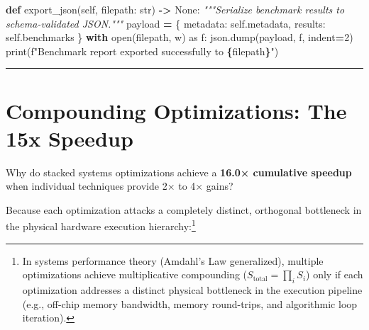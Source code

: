 \documentclass[
  letterpaper,
]{scrbook}
\newenvironment{Shaded}{\begin{snugshade}}{\end{snugshade}}
\newcommand{\BuiltInTok}[1]{#1}
\newcommand{\CommentTok}[1]{\textcolor[rgb]{0.56,0.35,0.01}{\textit{#1}}}
\newcommand{\ControlFlowTok}[1]{\textcolor[rgb]{0.13,0.29,0.53}{\textbf{#1}}}
\newcommand{\DecValTok}[1]{\textcolor[rgb]{0.00,0.00,0.81}{#1}}
\newcommand{\ImportTok}[1]{#1}
\newcommand{\KeywordTok}[1]{\textcolor[rgb]{0.13,0.29,0.53}{\textbf{#1}}}
\newcommand{\NormalTok}[1]{#1}
\newcommand{\OperatorTok}[1]{\textcolor[rgb]{0.81,0.36,0.00}{\textbf{#1}}}
\newcommand{\SpecialCharTok}[1]{\textcolor[rgb]{0.81,0.36,0.00}{\textbf{#1}}}
\newcommand{\SpecialStringTok}[1]{\textcolor[rgb]{0.31,0.60,0.02}{#1}}
\newcommand{\StringTok}[1]{\textcolor[rgb]{0.31,0.60,0.02}{#1}}
\newcommand{\VariableTok}[1]{\textcolor[rgb]{0.00,0.00,0.00}{#1}}
\begin{document}
\begin{Shaded}
\begin{Highlighting}[]
    \KeywordTok{def}\NormalTok{ export\_json(}\VariableTok{self}\NormalTok{, filepath: }\BuiltInTok{str}\NormalTok{) }\OperatorTok{{-}\textgreater{}} \VariableTok{None}\NormalTok{:}
        \CommentTok{"""Serialize benchmark results to schema{-}validated JSON."""}
\NormalTok{        payload }\OperatorTok{=}\NormalTok{ \{}
            \StringTok{\textquotesingle{}metadata\textquotesingle{}}\NormalTok{: }\VariableTok{self}\NormalTok{.metadata,}
            \StringTok{\textquotesingle{}results\textquotesingle{}}\NormalTok{: }\VariableTok{self}\NormalTok{.benchmarks}
\NormalTok{        \}}
        \ControlFlowTok{with} \BuiltInTok{open}\NormalTok{(filepath, }\StringTok{\textquotesingle{}w\textquotesingle{}}\NormalTok{) }\ImportTok{as}\NormalTok{ f:}
\NormalTok{            json.dump(payload, f, indent}\OperatorTok{=}\DecValTok{2}\NormalTok{)}
        \BuiltInTok{print}\NormalTok{(}\SpecialStringTok{f"Benchmark report exported successfully to }\SpecialCharTok{\{}\NormalTok{filepath}\SpecialCharTok{\}}\SpecialStringTok{"}\NormalTok{)}
\end{Highlighting}
\end{Shaded}

\begin{center}\rule{0.5\linewidth}{0.5pt}\end{center}

\section{Compounding Optimizations: The 15x
Speedup}\label{compounding-optimizations-the-15x-speedup}

Why do stacked systems optimizations achieve a \textbf{16.0× cumulative
speedup} when individual techniques provide 2× to 4× gains?

Because each optimization attacks a completely distinct, orthogonal
bottleneck in the physical hardware execution hierarchy:\footnote{In
  systems performance theory (Amdahl's Law generalized), multiple
  optimizations achieve multiplicative compounding
  (\(S_{\text{total}} = \prod_i S_i\)) only if each optimization
  addresses a distinct physical bottleneck in the execution pipeline
  (e.g., off-chip memory bandwidth, memory round-trips, and algorithmic
  loop iteration).}
\end{document}
